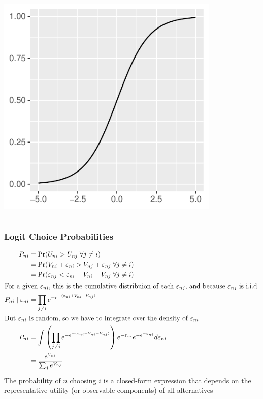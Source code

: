 \documentclass{beamer}\usepackage[]{graphicx}\usepackage[]{color}
\begin{document}
\begin{frame}
\begin{columns}
\begin{column}{0.5\textwidth}
\begin{center}
				\includegraphics[width=0.8\textwidth]{logistic_cdf.pdf}          
     		\end{center}
		\end{column}
	\end{columns}
\end{frame}

\begin{frame}\frametitle{Logit Choice Probabilities}
	\vspace{-4ex}
    \begin{align*}
    	P_{ni} &= \Pr(U_{ni} > U_{nj} \; \forall j \neq i) \\
    	&= \Pr(V_{ni} + \varepsilon_{ni} > V_{nj} + \varepsilon_{nj} \; \forall j \neq i) \\
    	&= \Pr(\varepsilon_{nj} < \varepsilon_{ni} + V_{ni} - V_{nj} \; \forall j \neq i) \\
    	\intertext{For a given $\varepsilon_{ni}$, this is the cumulative distribuion of each $\varepsilon_{nj}$, and because $\varepsilon_{nj}$ is i.i.d.}	 
    	P_{ni} \mid \varepsilon_{ni} &= \prod_{j \neq i} e^{-e^{-(\varepsilon_{ni} + V_{ni} - V_{nj})}} \\
    	\intertext{But $\varepsilon_{ni}$ is random, so we have to integrate over the density of $\varepsilon_{ni}$}
    	P_{ni} &= \int \left( \prod_{j \neq i} e^{-e^{-(\varepsilon_{ni} + V_{ni} - V_{nj})}} \right) e^{-\varepsilon_{ni}} e^{-e^{-\varepsilon_{ni}}} d\varepsilon_{ni} \\
    	&= \frac{e^{V_{ni}}}{\sum_j e^{V_{nj}}}
    \end{align*}
    The probability of $n$ choosing $i$ is a closed-form expression that depends on the representative utility (or observable components) of all alternatives
\end{frame}
\end{document}
